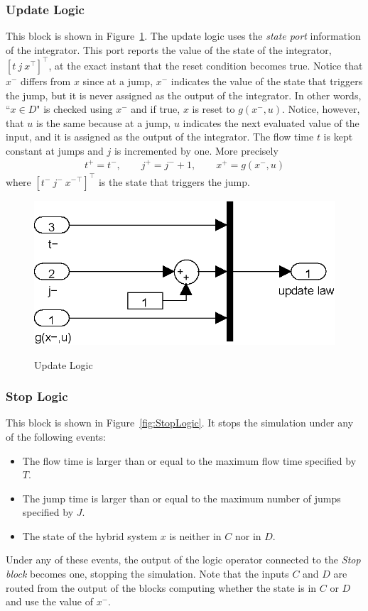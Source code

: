 \documentclass{article}
\begin{document}
\subsubsection{Update Logic}

This block is shown in Figure~\ref{fig:UpdateLogic}. The update logic uses the {\em state port} information of the integrator. This port reports the value of the state of the integrator, $[t\ j\ x^\top]^\top$, at the exact instant that the reset condition becomes true. Notice that $x^-$ differs from $x$ since at a jump, $x^-$ indicates the value of the state that triggers the jump, but it is never assigned as the output of the integrator. In other words, ``$x \in D$" is checked using $x^-$ and if true, $x$ is reset to $g(x^-,u)$. Notice, however, that $u$ is the same because at a jump, $u$ indicates the next evaluated value of the input, and it is assigned as the output of the integrator. The flow time $t$ is kept constant at jumps and $j$ is incremented by one. More precisely
\begin{eqnarray*}
t^+=t^-, \qquad j^+=j^-+1,\qquad x^+=g(x^-,u)
\end{eqnarray*}
where $[t^-\ j^-\ {x^-}^\top]^\top$ is the state that triggers the jump.

\begin{figure}[ht]
  \begin{center}
    {\includegraphics[width=.4\textwidth]{figures/Simulink/UpdateLogic.eps}}
   \caption{Update Logic}
\label{fig:UpdateLogic}
  \end{center}
\end{figure}




\subsubsection{Stop Logic}

This block is shown in Figure~\ref{fig:StopLogic}. It stops the simulation under any of the
following events:
\begin{itemize}
\item The flow time is larger than or equal to the maximum flow time specified by $T$.
\item The jump time is larger than or equal to the maximum number of jumps specified by $J$.
\item The state of the hybrid system $x$ is neither in $C$ nor in $D$.
\end{itemize}
Under any of these events, the output of the logic operator
connected to the {\em Stop block} becomes one, stopping the simulation.
Note that the inputs $C$ and $D$ are routed from the output of the blocks computing whether the state is in $C$ or $D$ and use the value of $x^-$.
\end{document}
